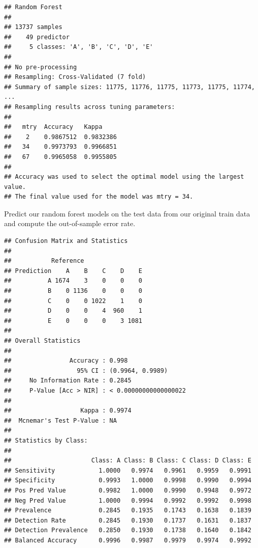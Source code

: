 \documentclass[]{article}
\newenvironment{Shaded}{\begin{snugshade}}{\end{snugshade}}
\newcommand{\KeywordTok}[1]{\textcolor[rgb]{0.13,0.29,0.53}{\textbf{#1}}}
\newcommand{\StringTok}[1]{\textcolor[rgb]{0.31,0.60,0.02}{#1}}
\newcommand{\OperatorTok}[1]{\textcolor[rgb]{0.81,0.36,0.00}{\textbf{#1}}}
\newcommand{\NormalTok}[1]{#1}
\begin{document}
\begin{verbatim}
## Random Forest 
## 
## 13737 samples
##    49 predictor
##     5 classes: 'A', 'B', 'C', 'D', 'E' 
## 
## No pre-processing
## Resampling: Cross-Validated (7 fold) 
## Summary of sample sizes: 11775, 11776, 11775, 11773, 11775, 11774, ... 
## Resampling results across tuning parameters:
## 
##   mtry  Accuracy   Kappa    
##    2    0.9867512  0.9832386
##   34    0.9973793  0.9966851
##   67    0.9965058  0.9955805
## 
## Accuracy was used to select the optimal model using the largest value.
## The final value used for the model was mtry = 34.
\end{verbatim}

Predict our random forest models on the test data from our original
train data and compute the out-of-sample error rate.

\begin{Shaded}
\end{Shaded}

\begin{verbatim}
## Confusion Matrix and Statistics
## 
##           Reference
## Prediction    A    B    C    D    E
##          A 1674    3    0    0    0
##          B    0 1136    0    0    0
##          C    0    0 1022    1    0
##          D    0    0    4  960    1
##          E    0    0    0    3 1081
## 
## Overall Statistics
##                                                
##                Accuracy : 0.998                
##                  95% CI : (0.9964, 0.9989)     
##     No Information Rate : 0.2845               
##     P-Value [Acc > NIR] : < 0.00000000000000022
##                                                
##                   Kappa : 0.9974               
##  Mcnemar's Test P-Value : NA                   
## 
## Statistics by Class:
## 
##                      Class: A Class: B Class: C Class: D Class: E
## Sensitivity            1.0000   0.9974   0.9961   0.9959   0.9991
## Specificity            0.9993   1.0000   0.9998   0.9990   0.9994
## Pos Pred Value         0.9982   1.0000   0.9990   0.9948   0.9972
## Neg Pred Value         1.0000   0.9994   0.9992   0.9992   0.9998
## Prevalence             0.2845   0.1935   0.1743   0.1638   0.1839
## Detection Rate         0.2845   0.1930   0.1737   0.1631   0.1837
## Detection Prevalence   0.2850   0.1930   0.1738   0.1640   0.1842
## Balanced Accuracy      0.9996   0.9987   0.9979   0.9974   0.9992
\end{verbatim}
\end{document}

